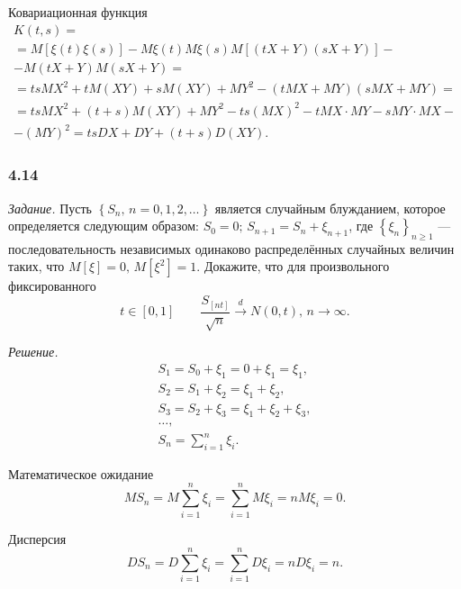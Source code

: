 Ковариационная функция
\begin{gather*}
  K \left( t, s \right) = \\
  = M \left[ \xi \left( t \right) \xi \left( s \right) \right] -
  M \xi \left( t \right) M \xi \left( s \right)
  M \left[ \left( tX + Y \right) \left( sX + Y \right) \right] - \\
  - M \left( tX + Y \right) M \left( sX + Y \right) = \\
  = tsMX^2 + tM \left( XY \right) + sM \left( XY \right) + MY^2 -
  \left( tMX + MY \right) \left( sMX + MY \right) = \\
  = tsMX^2 + \left( t + s \right) M \left( XY \right) + MY^2 - ts \left( MX \right)^2 -
  tMX \cdot MY - sMY \cdot MX - \\
  - \left( MY \right)^2 =
  tsDX + DY + \left( t + s \right) D \left( XY \right).
\end{gather*}

\subsubsection*{4.14}

\textit{Задание.}
Пусть $ \left\{ S_n, \, n = 0, 1, 2, \dotsc \right\} $ является случайным блужданием,
которое определяется следующим образом: $S_0 = 0; \, S_{n + 1} = S_n + \xi_{n + 1}$,
где $ \left\{ \xi_n \right\}_{n \geq 1}$ ---
последовательность независимых одинаково распределённых случайных величин таких,
что $M \left[ \xi \right] = 0, \, M \left[ \xi^2 \right] = 1$.
Докажите, что для произвольного фиксированного
$$t \in \left[ 0, 1 \right] \qquad
  \frac{S_{ \left[ nt \right] }}{ \sqrt{n}} \overset{d}{ \to } N \left( 0, t \right), \,
  n \to \infty.$$

\textit{Решение.}
\begin{gather*}
  S_1 = S_0 + \xi_1 = 0 + \xi_1 = \xi_1, \\
  S_2 = S_1 + \xi_2 = \xi_1 + \xi_2, \\
  S_3 = S_2 + \xi_3 = \xi_1 + \xi_2 + \xi_3, \\
  \dotsc, \\
  S_n = \sum \limits_{i = 1}^n \xi_i.
\end{gather*}

Математическое ожидание
$$MS_n =
  M \sum \limits_{i = 1}^n \xi_i =
  \sum \limits_{i = 1}^n M \xi_i =
  nM \xi_i =
  0.$$

Дисперсия
$$DS_n =
  D \sum \limits_{i = 1}^n \xi_i =
  \sum \limits_{i = 1}^n D \xi_i =
  nD \xi_i =
  n.$$

